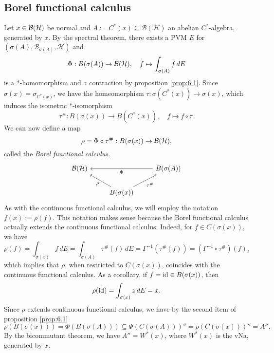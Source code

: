 \begin{comment}
\begin{lemma}[Goldstine's theorem]
  Let $X$ be a Banach space. Then the image of 
  $$\iota: X \to X^{**},\quad x \mapsto (f \mapsto f(x))$$
  is dense in the weak-$*$ topology.
\end{lemma}

\begin{myproof}
  Let $\beta \in X^{**}$ and $f_1, \dots, f_r \in X^*$ (w.l.o.g. linearly independent).
  The set
  $$U = \{\alpha \in X^{**}\ |\ |(\alpha - \beta) (f_j)| < \varepsilon,\ j = 1, \dots, r\}$$
  is a basic weak-$*$ open set in $X^{**}$.
  Assume $X$ is infinite-dimensional. Consider the surjective linear map 
  $$\Phi: X \to \C^r,\quad x \mapsto (f_1 (x),\dots, f_r (x)).$$
  Then, there exists $x_0 \in X$ such that 
  $$\Phi(x_0) = (\beta(f_1), \dots, \beta(f_r)),$$
  hence $\iota (x_0) \in U \cap \iota (X)$.
\end{myproof}
\end{comment}

\subsection{Borel functional calculus}

Let $x \in \operatorname{\mathcal{B} (\mathcal{H})}$ be normal and $A := C^* (x) \subseteq \mathcal{B}(\mathcal{H})$ an abelian $C^*$-algebra, generated by $x$.
By the spectral theorem, there exists a PVM $E$ for $(\sigma(A), \mathcal{B}_{\sigma(A)}, \mathcal{H})$ 
and 
$$\Phi: B (\sigma(A)) \to \operatorname{\mathcal{B} (\mathcal{H})},\quad f \mapsto \int_{\sigma(A)} f\, dE$$
is a $*$-homomorphism and a contraction by proposition \ref{prop:6.1}.
Since $\sigma(x) = \sigma_{C^* (x)}$, we have the homeomorphism $\tau: \sigma(C^* (x)) \to \sigma(x)$, which induces
the isometric $*$-isomorphism 
$$\tau^{\#}: B(\sigma(x)) \to B(C^* (x)),\quad f \mapsto f \circ \tau.$$
We can now define a map 
$$\rho = \Phi \circ \tau^{\#}: B(\sigma(x)) \to \operatorname{\mathcal{B} (\mathcal{H})},$$
called the \emph{Borel functional calculus}. 
\[\begin{tikzcd}
	{\bh} && {B(\sigma(A))} \\
	& {B(\sigma(x))}
	\arrow["{\tau^{\#}}"', from=2-2, to=1-3]
	\arrow["\rho", from=2-2, to=1-1]
	\arrow["\Phi", from=1-3, to=1-1]
\end{tikzcd}\]
As with the continuous functional calculus, we will employ the notation $f(x) := \rho(f)$.
This notation makes sense because the Borel functional calculus actually extends the continuous functional calculus.
Indeed, for $f \in C(\sigma(x))$, we have
$$\rho (f) = \int_{\sigma(x)} f\, dE = \int_{\sigma(A)} \tau^{\#}(f)\, dE = \Gamma^{-1} (\tau^{\#}(f)) = (\Gamma^{-1} \circ \tau^{\#})(f),$$
which implies that $\rho$, when restricted to $C(\sigma(x))$, coincides with the continuous functional calculus.
As a corollary, if $f = \operatorname{id} \in B(\sigma(x))$, then 
$$\rho (\operatorname{id}) = \int_{\sigma (x)} z \, dE = x.$$
Since $\rho$ extends continuous functional calculus, we have by the second item of proposition \ref{prop:6.1}
$$\rho (B(\sigma(x))) = \Phi (B(\sigma(A))) \subseteq \Phi (C(\sigma(A)))'' = \rho (C(\sigma(x)))'' = A''.$$
By the bicommutant theorem, we have $A'' = W^*(x)$, where $W^* (x)$ is the vNa, generated by $x$.

